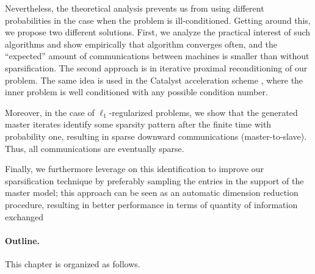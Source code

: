 {Nevertheless, the theoretical analysis prevents us from using different probabilities in the case when the problem is ill-conditioned. Getting around this, we propose two different solutions. First, we analyze the practical interest of such algorithms and show empirically that algorithm converges often, and the ``expected'' amount of communications between machines is smaller than without sparsification. The second approach is in iterative proximal reconditioning of our problem. The same idea is used in the Catalyst acceleration scheme \cite{lin2015universal}, where the inner problem is well conditioned with any possible condition number.

Moreover, in the case of $\ell_1$-regularized problems, we show that the generated master iterates identify some sparsity pattern after the finite time with probability one, resulting in sparse downward communications (master-to-slave). Thus, all communications are eventually sparse. 

Finally, we furthermore leverage on this identification to improve our sparsification technique by preferably sampling the entries in the support of the master model; 
this approach can be seen as an automatic dimension reduction procedure, resulting in better performance in terms of quantity of information exchanged {\color{red}{that is proven to be better than the non-sparsified algorithm in terms of communications with specific probability for coordinates outside the support.}}
\paragraph{Outline.}
This chapter is organized as follows.
}


